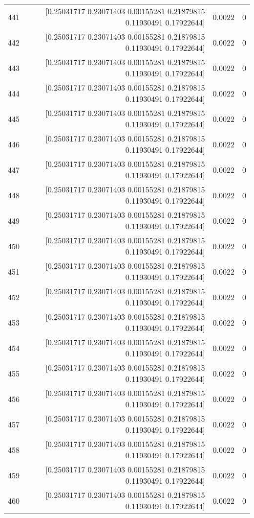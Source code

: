 \begin{longtable}{lrrr}
441 & [0.25031717 0.23071403 0.00155281 0.21879815 0.11930491 0.17922644] & 0.0022 & 0 \\
442 & [0.25031717 0.23071403 0.00155281 0.21879815 0.11930491 0.17922644] & 0.0022 & 0 \\
443 & [0.25031717 0.23071403 0.00155281 0.21879815 0.11930491 0.17922644] & 0.0022 & 0 \\
444 & [0.25031717 0.23071403 0.00155281 0.21879815 0.11930491 0.17922644] & 0.0022 & 0 \\
445 & [0.25031717 0.23071403 0.00155281 0.21879815 0.11930491 0.17922644] & 0.0022 & 0 \\
446 & [0.25031717 0.23071403 0.00155281 0.21879815 0.11930491 0.17922644] & 0.0022 & 0 \\
447 & [0.25031717 0.23071403 0.00155281 0.21879815 0.11930491 0.17922644] & 0.0022 & 0 \\
448 & [0.25031717 0.23071403 0.00155281 0.21879815 0.11930491 0.17922644] & 0.0022 & 0 \\
449 & [0.25031717 0.23071403 0.00155281 0.21879815 0.11930491 0.17922644] & 0.0022 & 0 \\
450 & [0.25031717 0.23071403 0.00155281 0.21879815 0.11930491 0.17922644] & 0.0022 & 0 \\
451 & [0.25031717 0.23071403 0.00155281 0.21879815 0.11930491 0.17922644] & 0.0022 & 0 \\
452 & [0.25031717 0.23071403 0.00155281 0.21879815 0.11930491 0.17922644] & 0.0022 & 0 \\
453 & [0.25031717 0.23071403 0.00155281 0.21879815 0.11930491 0.17922644] & 0.0022 & 0 \\
454 & [0.25031717 0.23071403 0.00155281 0.21879815 0.11930491 0.17922644] & 0.0022 & 0 \\
455 & [0.25031717 0.23071403 0.00155281 0.21879815 0.11930491 0.17922644] & 0.0022 & 0 \\
456 & [0.25031717 0.23071403 0.00155281 0.21879815 0.11930491 0.17922644] & 0.0022 & 0 \\
457 & [0.25031717 0.23071403 0.00155281 0.21879815 0.11930491 0.17922644] & 0.0022 & 0 \\
458 & [0.25031717 0.23071403 0.00155281 0.21879815 0.11930491 0.17922644] & 0.0022 & 0 \\
459 & [0.25031717 0.23071403 0.00155281 0.21879815 0.11930491 0.17922644] & 0.0022 & 0 \\
460 & [0.25031717 0.23071403 0.00155281 0.21879815 0.11930491 0.17922644] & 0.0022 & 0 \\

\end{longtable}
